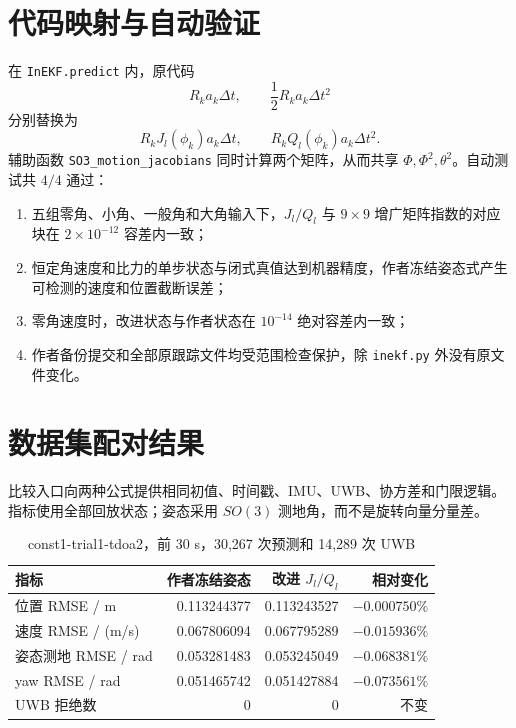 \documentclass[11pt,a4paper]{ctexart}
\begin{document}
\section{代码映射与自动验证}

在 \texttt{InEKF.predict} 内，原代码
\begin{equation}
 R_ka_k\Delta t,\qquad
 \frac12R_ka_k\Delta t^2
\end{equation}
分别替换为
\begin{equation}
 R_kJ_l(\phi_k)a_k\Delta t,\qquad
 R_kQ_l(\phi_k)a_k\Delta t^2.
\end{equation}
辅助函数 \texttt{SO3\_motion\_jacobians} 同时计算两个矩阵，从而共享
$\Phi,\Phi^2,\theta^2$。自动测试共 $4/4$ 通过：
\begin{enumerate}
 \item 五组零角、小角、一般角和大角输入下，$J_l/Q_l$ 与 $9\times9$
 增广矩阵指数的对应块在 $2\times10^{-12}$ 容差内一致；
 \item 恒定角速度和比力的单步状态与闭式真值达到机器精度，作者冻结姿态式产生
 可检测的速度和位置截断误差；
 \item 零角速度时，改进状态与作者状态在 $10^{-14}$ 绝对容差内一致；
 \item 作者备份提交和全部原跟踪文件均受范围检查保护，除
 \texttt{inekf.py} 外没有原文件变化。
\end{enumerate}

\section{数据集配对结果}

比较入口向两种公式提供相同初值、时间戳、IMU、UWB、协方差和门限逻辑。
指标使用全部回放状态；姿态采用 $SO(3)$ 测地角，而不是旋转向量分量差。

\begin{table}[H]
\centering
\small
\caption{const1-trial1-tdoa2，前 30 s，30,267 次预测和 14,289 次 UWB}
\begin{tabular}{lrrr}
\toprule
指标 & 作者冻结姿态 & 改进 $J_l/Q_l$ & 相对变化\\
\midrule
位置 RMSE / m & 0.113244377 & 0.113243527 & $-0.000750\%$\\
速度 RMSE / (m/s) & 0.067806094 & 0.067795289 & $-0.015936\%$\\
姿态测地 RMSE / rad & 0.053281483 & 0.053245049 & $-0.068381\%$\\
yaw RMSE / rad & 0.051465742 & 0.051427884 & $-0.073561\%$\\
UWB 拒绝数 & 0 & 0 & 不变\\
\bottomrule
\end{tabular}
\end{table}
\end{document}

